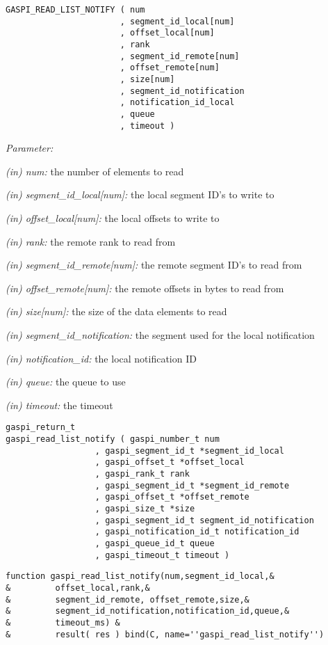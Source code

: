 \documentclass[a4paper]{article}
\newlength{\st}\setlength{\st}{0pt}
\newcommand{\parameter}[1]{{\it #1}}
\newenvironment{cbox}[1]
{\newcommand\colboxcolor{#1}\begin{lrbox}{\riddlebox}\begin{minipage}{\dimexpr\columnwidth-2\fboxsep\relax}}
{\end{minipage}\end{lrbox}\begin{center}\colorbox[HTML]{\colboxcolor}{\usebox{\riddlebox}}\end{center}}
\newcommand{\shortlistbegin}[1]{\begin{trivlist}\setlength{\itemsep}{0pt}\item[]\emph{#1:}}
\newcommand{\shortlistitem}[1]{\item[]#1}
\newcommand{\shortlistend}{\end{trivlist}}
\newenvironment{FDef}{\begin{trivlist}\item[]}{\end{trivlist}}
\newenvironment{FDefSign}{\begin{cbox}{EEEEEE}}{\end{cbox}}
\newcommand{\parameterlistbegin}{\shortlistbegin{Parameter}}
\newcommand{\parameterlistend}{\shortlistend}
\newcommand{\parameterlistitem}[3]{\shortlistitem{\parameter{(#1) #2:} {#3}}}
\begin{document}
\begin{FDef}
\begin{FDefSign}
\begin{verbatim}
GASPI_READ_LIST_NOTIFY ( num
                       , segment_id_local[num]
                       , offset_local[num]
                       , rank
                       , segment_id_remote[num]
                       , offset_remote[num]
                       , size[num]
                       , segment_id_notification
                       , notification_id_local
                       , queue
                       , timeout )
\end{verbatim}
\end{FDefSign}
\parameterlistbegin
\parameterlistitem{in}{num}{the number of elements to read}
\parameterlistitem{in}{segment\_id\_local[num]}{the local segment ID's to write to}
\parameterlistitem{in}{offset\_local[num]}{the local offsets to write to}
\parameterlistitem{in}{rank}{the remote rank to read from}
\parameterlistitem{in}{segment\_id\_remote[num]}{the remote segment ID's to read from}
\parameterlistitem{in}{offset\_remote[num]}{the remote offsets in bytes to read from}
\parameterlistitem{in}{size[num]}{the size of the data elements to read}
\parameterlistitem{in}{segment\_id\_notification}{the segment used for the local notification}
\parameterlistitem{in}{notification\_id}{the local notification ID}
\parameterlistitem{in}{queue}{the queue to use}
\parameterlistitem{in}{timeout}{the timeout}
\parameterlistend

\begin{FDefSign}
\begin{verbatim}
gaspi_return_t
gaspi_read_list_notify ( gaspi_number_t num
                  , gaspi_segment_id_t *segment_id_local
                  , gaspi_offset_t *offset_local
                  , gaspi_rank_t rank
                  , gaspi_segment_id_t *segment_id_remote
                  , gaspi_offset_t *offset_remote
                  , gaspi_size_t *size
                  , gaspi_segment_id_t segment_id_notification
                  , gaspi_notification_id_t notification_id
                  , gaspi_queue_id_t queue
                  , gaspi_timeout_t timeout )
\end{verbatim}
\end{FDefSign}
\begin{FDefSign}
\begin{verbatim}
function gaspi_read_list_notify(num,segment_id_local,&
&         offset_local,rank,&
&         segment_id_remote, offset_remote,size,&
&         segment_id_notification,notification_id,queue,&
&         timeout_ms) &           
&         result( res ) bind(C, name=''gaspi_read_list_notify'')
                        

\end{verbatim}
\end{FDefSign}
\end{FDef}
\end{document}

